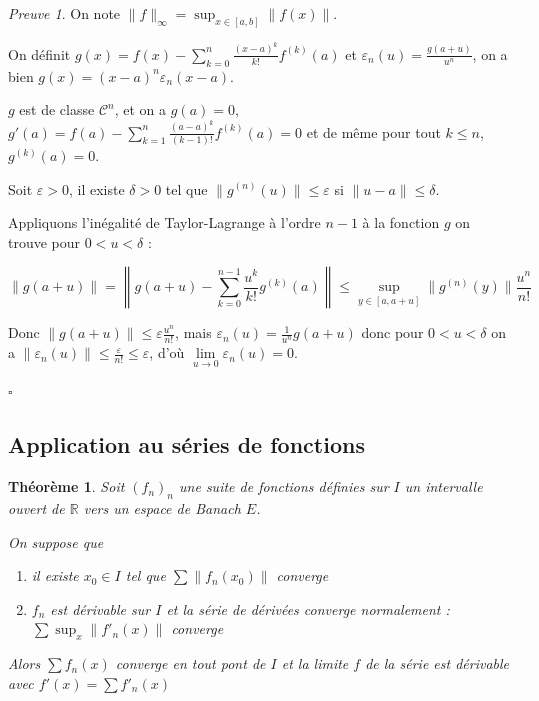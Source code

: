 \documentclass[]{article}
\newtheorem{mythm}{Théorème}
\theoremstyle{remark}
\newtheorem{myproof}{Preuve}
\theoremstyle{definition}
\newcommand{\cqfd}{
	\hfill$\square$
}
\begin{document}
\begin{myproof}
	On note $\|f\|_{\infty} = \displaystyle \sup_{x \in [a, b]} \|f(x)\|$.

	On définit $g(x) = f(x) - \sum_{k = 0}^{n} \frac{(x-a)^k}{k!} f^{(k)}(a)$ et $\varepsilon_n(u) = \frac{g(a+u)}{u^n}$, on a bien $g(x) = (x-a)^n \varepsilon_n(x - a)$.
	
	$g$ est de classe $\mathcal{C}^n$, et on a $g(a) = 0$, $g'(a) = f(a) - \sum_{k = 1}^{n} \frac{(a-a)^k}{(k-1)!}f^{(k)}(a) = 0$ et de même pour tout $k \leqslant n$, $g^{(k)}(a) = 0$.
	
	Soit $\varepsilon > 0$, il existe $\delta > 0$ tel que $\|g^{(n)}(u)\| \leqslant \varepsilon$ si $\|u - a\| \leqslant \delta$.
	
	Appliquons l'inégalité de Taylor-Lagrange à l'ordre $n-1$ à la fonction $g$ on trouve pour $0 < u < \delta$ : 
	
	$$\|g(a+u)\| = \left\|g(a+u) - \sum_{k = 0}^{n-1} \frac{u^k}{k!} g^{(k)}(a)\right\| \leqslant \sup_{y \in [a, a+u]} \|g^{(n)}(y)\| \frac{u^n}{n!}$$
	
	Donc $\|g(a+u)\| \leqslant \varepsilon \frac{u^n}{n!}$, mais $\varepsilon_n(u) = \frac{1}{u^n} g(a+u)$ donc pour $0 < u< \delta$ on a $\|\varepsilon_n(u)\| \leqslant \frac{\varepsilon}{n!} \leqslant \varepsilon$, d'où $\lim\limits_{u \to 0} \varepsilon_n(u) = 0$.
	
	\cqfd
\end{myproof}

\subsection{Application au séries de fonctions}

\begin{mythm}
	Soit $(f_n)_n$ une suite de fonctions définies sur $I$ un intervalle ouvert de $\mathbb{R}$ vers un espace de Banach $E$.
	
	On suppose que
	\begin{enumerate}
		\item il existe $x_0 \in I$ tel que $\sum \|f_n(x_0)\|$ converge
		\item $f_n$ est dérivable sur $I$ et la série de dérivées converge normalement : $\sum \sup_x \|f'_n(x)\|$ converge
	\end{enumerate}
	
	Alors $\sum f_n(x)$ converge en tout pont de $I$ et la limite $f$ de la série est dérivable avec $f'(x) = \sum f'_n(x)$
\end{mythm}
\end{document}
